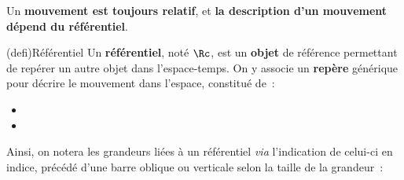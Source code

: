 \documentclass[../../main/main.tex]{subfiles}
\begin{document}
Un \textbf{mouvement est toujours relatif}, et \textbf{la description
	d'un mouvement dépend du référentiel}.

\begin{tcb*}(defi){Référentiel}
	Un \textbf{référentiel}, noté $\Rc$, est un \textbf{objet} de référence
	permettant de repérer un autre objet dans l'espace-temps. On y
	associe un \textbf{repère} générique pour décrire le mouvement dans l'espace,
	constitué de~:
	\begin{itemize}
		\item {}
		\item {}
	\end{itemize}
	\smallbreak
	Ainsi, on notera les grandeurs liées à un
	référentiel \textit{via} l'indication de celui-ci en indice, précédé d'une barre
	oblique ou verticale selon la taille de la grandeur~:
	\vspace{-15pt}
\end{tcb*}
\end{document}
